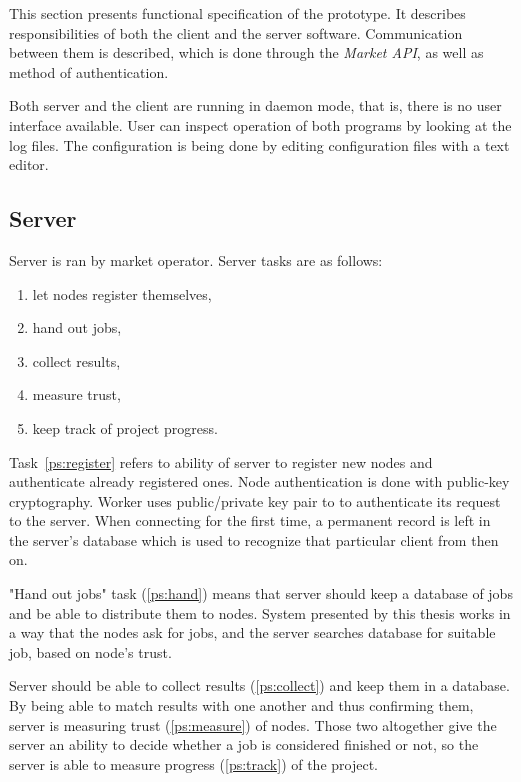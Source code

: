 This section presents functional specification of the prototype. It describes responsibilities of both the client and the server software. Communication between them is described, which is done through the \emph{Market API}, as well as method of authentication.

Both server and the client are running in daemon mode, that is, there is no user interface available. User can inspect operation of both programs by looking at the log files. The configuration is being done by editing configuration files with a text editor.

\subsection{Server}

Server is ran by market operator. Server tasks are as follows:

\begin{enumerate}
	\item \label{ps:register} let nodes register themselves,
	\item \label{ps:hand} hand out jobs,
	\item \label{ps:collect} collect results,
	\item \label{ps:measure} measure trust,
	\item \label{ps:track} keep track of project progress.
\end{enumerate}

Task~\ref{ps:register} refers to ability of server to register new nodes and authenticate already registered ones. Node authentication is done with public-key cryptography. Worker uses public/private key pair to to authenticate its request to the server. When connecting for the first time, a permanent record is left in the server's database which is used to recognize that particular client from then on.

"Hand out jobs" task (\ref{ps:hand}) means that server should keep a database of jobs and be able to distribute them to nodes. System presented by this thesis works in a way that the nodes ask for jobs, and the server searches database for suitable job, based on node's trust.

Server should be able to collect results (\ref{ps:collect}) and keep them in a database. By being able to match results with one another and thus confirming them, server is measuring trust (\ref{ps:measure}) of nodes. Those two altogether give the server an ability to decide whether a job is considered finished or not, so the server is able to measure progress (\ref{ps:track}) of the project.

